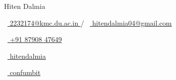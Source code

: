 \vspace*{-0.10em}
\begin{Large} 
	Hiten Dalmia
\end{Large}

\begin{footnotesize}
	\quad \begin{tiny}\faEnvelope[regular]\end{tiny}~\href{mailto:2232174@kmc.du.ac.in}{%
		2232174@kmc.du.ac.in
	} / ~\href{mailto:hitendalmia04@gmail.com}{%
		hitendalmia04@gmail.com
	} 
	
	\begin{tiny}\faMobile*\end{tiny}~\href{tel:918790847649}{
		+91 87908 47649
	} 
	\quad 
	\begin{tiny}\faLinkedinIn\end{tiny}~\href{https://www.linkedin.com/in/hitendalmia/}{
		hitendalmia
	}
	\quad 
	\begin{tiny}\faGithub\end{tiny}~\href{https://github.com/confumbit/ }{
		 confumbit
		}

\end{footnotesize}